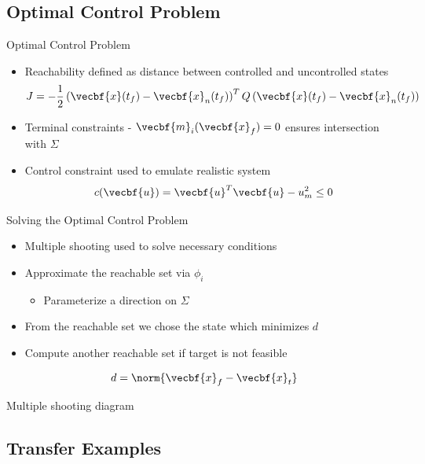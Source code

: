 \subsection*{Optimal Control Problem}

\begin{frame}{Optimal Control Problem}
\begin{itemize}
    \item Reachability defined as distance between controlled and uncontrolled states
        \[
            J = -\frac{1}{2} \left( \vecbf{x}(t_f) - \vecbf{x}_{n}(t_f)\right)^T 
            Q
            \left( \vecbf{x}(t_f) - \vecbf{x}_{n}(t_f)\right) 
        \]
    
    \pause
    \item Terminal constraints - \( \vecbf{m}_i(\vecbf{x}_f) = 0\) ensures intersection with \( \Sigma \)
    \pause
    \item Control constraint used to emulate realistic system
        \[
            c(\vecbf{u}) = \vecbf{u}^T \vecbf{u} - u_m^2 \leq 0 
        \]
\end{itemize}

\end{frame}

\begin{frame}{Solving the Optimal Control Problem}
\begin{itemize}
    \item Multiple shooting used to solve necessary conditions
    \pause
    \item Approximate the reachable set via \( \phi_i \) 
    \begin{itemize}
        \item Parameterize a direction on \( \Sigma \)
    \end{itemize}
    \pause
    \item From the reachable set we chose the state which minimizes \( d \) 
    \item Compute another reachable set if target is not feasible
\end{itemize}
\[
    d = \norm{\vecbf{x}_f - \vecbf{x}_t} 
\]

{\LARGE Multiple shooting diagram}
\end{frame}

\subsection*{Transfer Examples}

